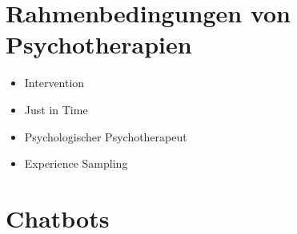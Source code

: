 \section{Rahmenbedingungen von Psychotherapien}

\begin{itemize}
\item Intervention
\item Just in Time
\item Psychologischer Psychotherapeut
\item Experience Sampling
\end{itemize}

\section{Chatbots}

